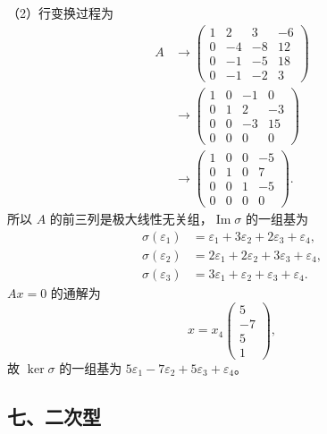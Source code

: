 \documentclass[11pt,fontset=fandol]{ctexart}
\begin{document}
（2）行变换过程为 \[
\begin{aligned}
A&\longrightarrow\begin{pmatrix}1&2&3&-6\\0&-4&-8&12\\0&-1&-5&18\\0&-1&-2&3\end{pmatrix}\\
&\longrightarrow\begin{pmatrix}1&0&-1&0\\0&1&2&-3\\0&0&-3&15\\0&0&0&0\end{pmatrix}\\
&\longrightarrow\begin{pmatrix}1&0&0&-5\\0&1&0&7\\0&0&1&-5\\0&0&0&0\end{pmatrix}.
\end{aligned}
\] 所以 \(A\) 的前三列是极大线性无关组，\(\operatorname{Im}\sigma\)
的一组基为 \[
\begin{aligned}
\sigma(\varepsilon_1)&=\varepsilon_1+3\varepsilon_2+2\varepsilon_3+\varepsilon_4,\\
\sigma(\varepsilon_2)&=2\varepsilon_1+2\varepsilon_2+3\varepsilon_3+\varepsilon_4,\\
\sigma(\varepsilon_3)&=3\varepsilon_1+\varepsilon_2+\varepsilon_3+\varepsilon_4.
\end{aligned}
\] \(Ax=0\) 的通解为 \[
x=x_4\begin{pmatrix}5\\-7\\5\\1\end{pmatrix},
\] 故 \(\ker\sigma\) 的一组基为
\(5\varepsilon_1-7\varepsilon_2+5\varepsilon_3+\varepsilon_4\)。

\subsection{七、二次型}\label{ux4e03ux4e8cux6b21ux578b}
\end{document}
